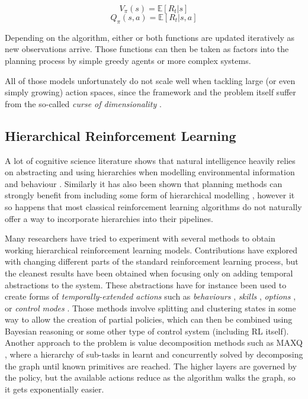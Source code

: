 \begin{equation}
V_{\pi}(s) = \mathbb{E}[R_t | s]
\label{eq:value}
\end{equation}
\begin{equation}
Q_{\pi}(s, a) = \mathbb{E}[R_t | s, a]
\label{eq:q_act}
\end{equation}

Depending on the algorithm, either or both functions are updated iteratively as
new observations arrive. Those functions can then be taken as factors into the
planning process by simple greedy agents or more complex systems.


All of those models unfortunately do not scale well when tackling large (or even
simply growing) action spaces, since the framework and the problem itself suffer
from the so-called \emph{curse of dimensionality} \citep{bellman1957dynamic}.

\subsection{Hierarchical Reinforcement Learning}

A lot of cognitive science literature shows that natural intelligence heavily
relies on abstracting and using hierarchies when modelling environmental
information and behaviour \citep{gentner2014mental, byrne1989spatial,
  colunga2005lexicon}. Similarly it has also been shown that planning methods
can strongly benefit from including some form of hierarchical modelling
\citep{knoblock1994automatically}, however it so happens that most classical
reinforcement learning algorithms do not naturally offer a way to incorporate
hierarchies into their pipelines.

Many researchers have tried to experiment with several methods to obtain working
hierarchical reinforcement learning models. Contributions have explored with
changing different parts of the standard reinforcement learning process, but the
cleanest results have been obtained when focusing only on adding temporal
abstractions to the system. These abstractions have for instance been used to
create forms of \emph{temporally-extended actions} such as \emph{behaviours}
\citep{brooks1986achieving}, \emph{skills} \citep{thrun1995finding},
\emph{options} \citep{sutton1999between}, or \emph{control modes}
\citep{grudic2000localizing}. Those methods involve splitting and clustering
states in some way to allow the creation of partial policies, which can then be
combined using Bayesian reasoning or some other type of control system
(including RL itself).
Another approach to the problem is value decomposition methods such as MAXQ
\citep{dietterich2000hierarchical}, where a hierarchy of sub-tasks in learnt and
concurrently solved by decomposing the graph until known primitives are reached.
The higher layers are governed by the policy, but the available actions reduce
as the algorithm walks the graph, so it gets exponentially easier.

